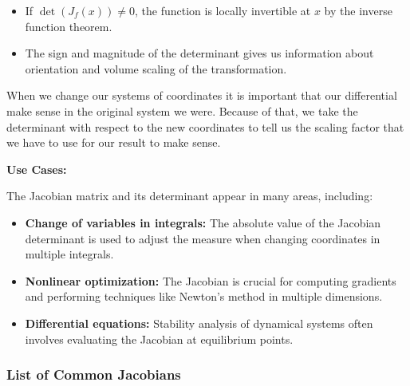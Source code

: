 \begin{itemize}

    \item If \(\det(J_{f}(x)) \neq 0\), the function is locally invertible at \(x\) by the inverse 
      function theorem.
  
      \item The sign and magnitude of the determinant 
      gives us information about orientation and volume scaling of the transformation.

\end{itemize}

When we change our systems of coordinates it is important that our differential make sense in the original 
system we were. Because of that, we take the determinant with respect to the new coordinates to tell us 
the scaling factor that we have to use for our result to make sense.

\textbf{Use Cases:}

The Jacobian matrix and its determinant appear in many areas, including:

\begin{itemize}
  
    \item \textbf{Change of variables in integrals:} The absolute value of the Jacobian determinant is 
          used to adjust the measure when changing coordinates in multiple integrals.
  
    \item \textbf{Nonlinear optimization:} The Jacobian is crucial for computing gradients and 
          performing techniques like Newton's method in multiple dimensions.
  
    \item \textbf{Differential equations:} Stability analysis of dynamical systems often involves 
          evaluating the Jacobian at equilibrium points.

\end{itemize}

\subsubsection{List of Common Jacobians}

